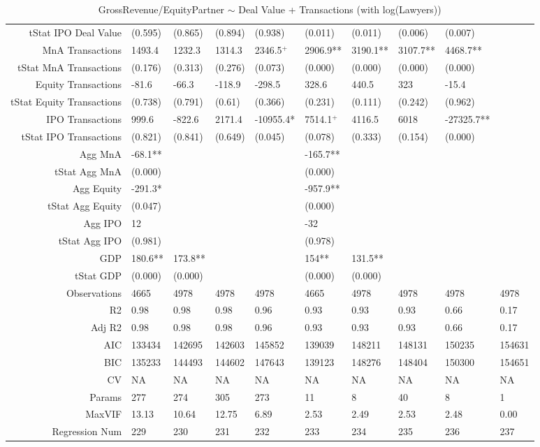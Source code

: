 \begin{table}[ht]
\begin{tabular}{rlllllllll}
  tStat IPO Deal Value & (0.595) & (0.865) & (0.894) & (0.938) & (0.011) & (0.011) & (0.006) & (0.007) &  \\ 
  MnA Transactions & 1493.4 & 1232.3 & 1314.3 & 2346.5$^{+}$ & 2906.9** & 3190.1** & 3107.7** & 4468.7** &  \\ 
  tStat MnA Transactions & (0.176) & (0.313) & (0.276) & (0.073) & (0.000) & (0.000) & (0.000) & (0.000) &  \\ 
  Equity Transactions & -81.6 & -66.3 & -118.9 & -298.5 & 328.6 & 440.5 & 323 & -15.4 &  \\ 
  tStat Equity Transactions & (0.738) & (0.791) & (0.61) & (0.366) & (0.231) & (0.111) & (0.242) & (0.962) &  \\ 
  IPO Transactions & 999.6 & -822.6 & 2171.4 & -10955.4* & 7514.1$^{+}$ & 4116.5 & 6018 & -27325.7** &  \\ 
  tStat IPO Transactions & (0.821) & (0.841) & (0.649) & (0.045) & (0.078) & (0.333) & (0.154) & (0.000) &  \\ 
  Agg MnA & -68.1** &  &  &  & -165.7** &  &  &  &  \\ 
  tStat Agg MnA & (0.000) &  &  &  & (0.000) &  &  &  &  \\ 
  Agg Equity & -291.3* &  &  &  & -957.9** &  &  &  &  \\ 
  tStat Agg Equity & (0.047) &  &  &  & (0.000) &  &  &  &  \\ 
  Agg IPO & 12 &  &  &  & -32 &  &  &  &  \\ 
  tStat Agg IPO & (0.981) &  &  &  & (0.978) &  &  &  &  \\ 
  GDP & 180.6** & 173.8** &  &  & 154** & 131.5** &  &  &  \\ 
  tStat GDP & (0.000) & (0.000) &  &  & (0.000) & (0.000) &  &  &  \\ 
  Observations & 4665 & 4978 & 4978 & 4978 & 4665 & 4978 & 4978 & 4978 & 4978 \\ 
  R2 & 0.98 & 0.98 & 0.98 & 0.96 & 0.93 & 0.93 & 0.93 & 0.66 & 0.17 \\ 
  Adj R2 & 0.98 & 0.98 & 0.98 & 0.96 & 0.93 & 0.93 & 0.93 & 0.66 & 0.17 \\ 
  AIC & 133434 & 142695 & 142603 & 145852 & 139039 & 148211 & 148131 & 150235 & 154631 \\ 
  BIC & 135233 & 144493 & 144602 & 147643 & 139123 & 148276 & 148404 & 150300 & 154651 \\ 
  CV & NA & NA & NA & NA & NA & NA & NA & NA & NA \\ 
  Params & 277 & 274 & 305 & 273 & 11 & 8 & 40 & 8 & 1 \\ 
  MaxVIF & 13.13 & 10.64 & 12.75 & 6.89 & 2.53 & 2.49 & 2.53 & 2.48 & 0.00 \\ 
  Regression Num & 229 & 230 & 231 & 232 & 233 & 234 & 235 & 236 & 237 \\ 
   \hline
\end{tabular}
\caption{GrossRevenue/EquityPartner $\sim$ Deal Value + Transactions (with log(Lawyers))} 
\end{table}
